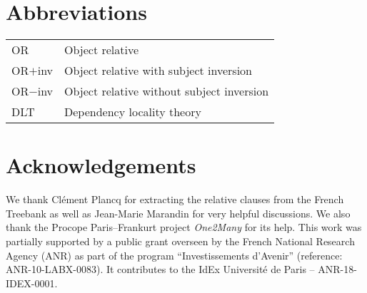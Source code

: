 \documentclass[output=paper]{langscibook}
\begin{document}
\section*{Abbreviations}
\begin{tabular}{@{}ll@{}}
OR & Object relative\\
OR$+$inv & Object relative with subject inversion \\
OR$-$inv & Object relative without subject inversion\\
DLT & Dependency locality theory \\
\end{tabular}

\section*{Acknowledgements}
We thank Clément Plancq for extracting the relative clauses from the French Treebank as well as Jean-Marie Marandin for very helpful discussions. We also thank the Procope Paris--Frankurt project \textit{One2Many} for its help. This work was partially supported by a public grant overseen by the French National Research Agency (ANR) as part of the program “Investissements d’Avenir” (reference: ANR-10-LABX-0083). It contributes to the IdEx Université de Paris – ANR-18-IDEX-0001.

{\sloppy\printbibliography[heading=subbibliography,notkeyword=this]}
\end{document}
